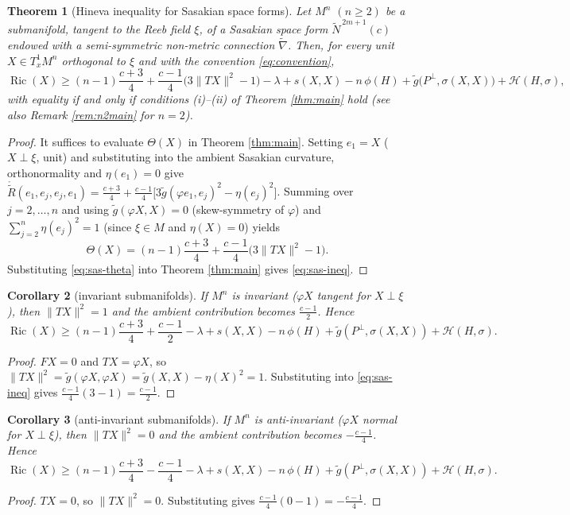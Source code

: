 \documentclass[11pt]{article}
\newtheorem{theorem}{Theorem}[section]
\newtheorem{corollary}[theorem]{Corollary}
\theoremstyle{definition}
\newcommand{\tN}{\widetilde{N}}
\newcommand{\tg}{\widetilde{g}}
\newcommand{\tnabla}{\widetilde{\nabla}}
\newcommand{\ctR}{\mathring{\widetilde{R}}}
\newcommand{\Ric}{\operatorname{Ric}}
\newcommand{\HH}{\mathcal{H}}
\begin{document}
\begin{theorem}[Hineva inequality for Sasakian space forms]\label{thm:sasakian}
Let $M^n$ $(n\ge2)$ be a submanifold, tangent to the Reeb field $\xi$, of a Sasakian space form $\tN^{\,2m+1}(c)$ endowed with a semi-symmetric non-metric connection $\tnabla$. Then, for every unit $X\in T^1_xM^n$ orthogonal to $\xi$ and with the convention \eqref{eq:convention},
\begin{equation}\label{eq:sas-ineq}
\Ric(X)\ge(n-1)\frac{c+3}{4}+\frac{c-1}{4}\bigl(3\|TX\|^2-1\bigr)-\lambda+s(X,X)-n\,\phi(H)+\tg\bigl(P^\perp,\sigma(X,X)\bigr)+\HH(H,\sigma),
\end{equation}
with equality if and only if conditions (i)--(ii) of Theorem \ref{thm:main} hold (see also Remark \ref{rem:n2main} for $n=2$).
\end{theorem}
\begin{proof}
It suffices to evaluate $\Theta(X)$ in Theorem \ref{thm:main}. Setting $e_1=X$ ($X\perp\xi$, unit) and substituting into the ambient Sasakian curvature, orthonormality and $\eta(e_1)=0$ give $\ctR(e_1,e_j,e_j,e_1)=\frac{c+3}{4}+\frac{c-1}{4}\bigl[3\tg(\varphi e_1,e_j)^2-\eta(e_j)^2\bigr]$. Summing over $j=2,\dots,n$ and using $\tg(\varphi X,X)=0$ (skew-symmetry of $\varphi$) and $\sum_{j=2}^{n}\eta(e_j)^2=1$ (since $\xi\in M$ and $\eta(X)=0$) yields
\begin{equation}\label{eq:sas-theta}
\Theta(X)=(n-1)\frac{c+3}{4}+\frac{c-1}{4}\bigl(3\|TX\|^2-1\bigr).
\end{equation}
Substituting \eqref{eq:sas-theta} into Theorem \ref{thm:main} gives \eqref{eq:sas-ineq}.
\end{proof}

\begin{corollary}[invariant submanifolds]\label{cor:sas-inv}
If $M^n$ is invariant ($\varphi X$ tangent for $X\perp\xi$), then $\|TX\|^2=1$ and the ambient contribution becomes $\tfrac{c-1}{2}$. Hence
\begin{equation}\label{eq:sas-inv}
\Ric(X)\ge(n-1)\frac{c+3}{4}+\frac{c-1}{2}-\lambda+s(X,X)-n\,\phi(H)+\tg(P^\perp,\sigma(X,X))+\HH(H,\sigma).
\end{equation}
\end{corollary}
\begin{proof}
$FX=0$ and $TX=\varphi X$, so $\|TX\|^2=\tg(\varphi X,\varphi X)=\tg(X,X)-\eta(X)^2=1$. Substituting into \eqref{eq:sas-ineq} gives $\tfrac{c-1}{4}(3-1)=\tfrac{c-1}{2}$.
\end{proof}

\begin{corollary}[anti-invariant submanifolds]\label{cor:sas-anti}
If $M^n$ is anti-invariant ($\varphi X$ normal for $X\perp\xi$), then $\|TX\|^2=0$ and the ambient contribution becomes $-\tfrac{c-1}{4}$. Hence
\begin{equation}\label{eq:sas-anti}
\Ric(X)\ge(n-1)\frac{c+3}{4}-\frac{c-1}{4}-\lambda+s(X,X)-n\,\phi(H)+\tg(P^\perp,\sigma(X,X))+\HH(H,\sigma).
\end{equation}
\end{corollary}
\begin{proof}
$TX=0$, so $\|TX\|^2=0$. Substituting gives $\tfrac{c-1}{4}(0-1)=-\tfrac{c-1}{4}$.
\end{proof}
\end{document}
